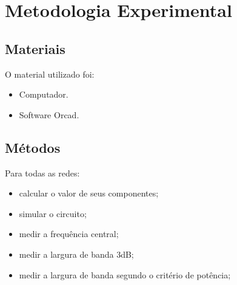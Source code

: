 \newpage
\section{Metodologia Experimental}

\subsection{Materiais}
O material utilizado foi:
\begin{itemize}
\item Computador.
\item Software Orcad.
\end{itemize}

\subsection{Métodos}
Para todas as redes:

\begin{itemize}
    \item calcular o valor de seus componentes;
    \item simular o circuito;
    \item medir a frequência central;
    \item medir a largura de banda 3dB;
    \item medir a largura de banda segundo o critério de potência;
   \end{itemize} 
